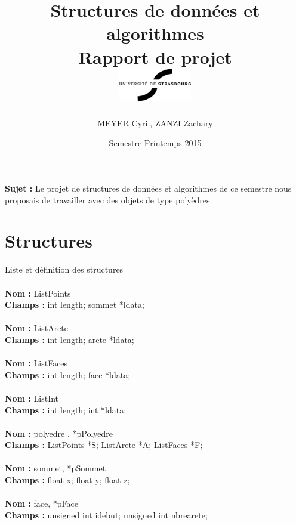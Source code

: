 \documentclass[a4paper,11pt]{article}
\begin{document}
\title{{\textbf{Structures de données et algorithmes}\\}{Rapport de projet\\}
{\vspace{1cm}}{\includegraphics[width=120px]{uds-NoirBlanc.png}}{\vspace{3cm}
}}
\date{Semestre Printemps 2015}
\author{MEYER Cyril, ZANZI Zachary}
\maketitle 
\textbf{{Sujet :}}
Le projet de structures de données et algorithmes de ce semestre nous proposais de travailler avec des objets de type polyèdres.
\thispagestyle{empty}

\newpage
\setcounter{page}{1}

\section{Structures}
Liste et définition des structures
\\
\\
\textbf{{Nom :}} ListPoints
\\
\textbf{{Champs :}} int length; sommet *ldata;
\\
\\
\textbf{{Nom :}} ListArete
\\
\textbf{{Champs :}} int length; arete *ldata;
\\
\\
\textbf{{Nom :}} ListFaces
\\
\textbf{{Champs :}} int length; face *ldata;
\\
\\
\textbf{{Nom :}} ListInt
\\
\textbf{{Champs :}} int length; int *ldata;
\\
\\
\textbf{{Nom :}} polyedre , *pPolyedre
\\
\textbf{{Champs :}} ListPoints *S; ListArete *A; ListFaces *F;
\\
\\
\textbf{{Nom :}} sommet, *pSommet
\\
\textbf{{Champs :}} float x; float y; float z;
\\
\\
\textbf{{Nom :}} face, *pFace
\\
\textbf{{Champs :}} unsigned int idebut; unsigned int nbrearete;
\\
\\
\newpage
\end{document}
